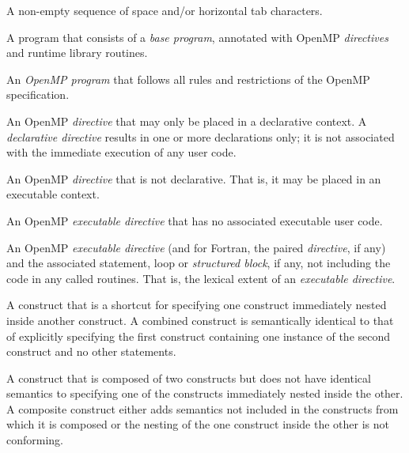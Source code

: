 \glossarydefstart
A non-empty sequence of space and/or horizontal tab characters.
\glossarydefend

\glossarydefstart
A program that consists of a \emph{base program}, annotated with OpenMP \emph{directives} and 
runtime library routines.
\glossarydefend

\glossarydefstart
An \emph{OpenMP program} that follows all rules and restrictions of the OpenMP 
specification.
\glossarydefend

\glossarydefstart
An OpenMP \emph{directive} that may only be placed in a declarative context. A 
\emph{declarative directive} results in one or more declarations only; it is not associated 
with the immediate execution of any user code.
\glossarydefend

\glossarydefstart
An OpenMP \emph{directive} that is not declarative. That is, it may be placed in an 
executable context.
\glossarydefend

\glossarydefstart
An OpenMP \emph{executable directive} that has no associated executable user code.
\glossarydefend


\glossarydefstart
An OpenMP \emph{executable directive} (and for Fortran, the paired  \emph{directive}, if 
any) and the associated statement, loop or \emph{structured block}, if any, not including 
the code in any called routines. That is, the lexical extent of an \emph{executable 
directive}.
\glossarydefend

\glossarydefstart
A construct that is a shortcut for specifying one construct immediately nested inside another construct. A combined construct is semantically identical to that of explicitly specifying the first construct containing one instance of the second construct and no other statements.
\glossarydefend

\glossarydefstart 
A construct that is composed of two constructs but does not have identical semantics to specifying one of the constructs immediately nested inside the other. A composite construct either adds semantics not included in the constructs from which it is composed or the nesting of the one construct inside the other is not conforming.
\glossarydefend


